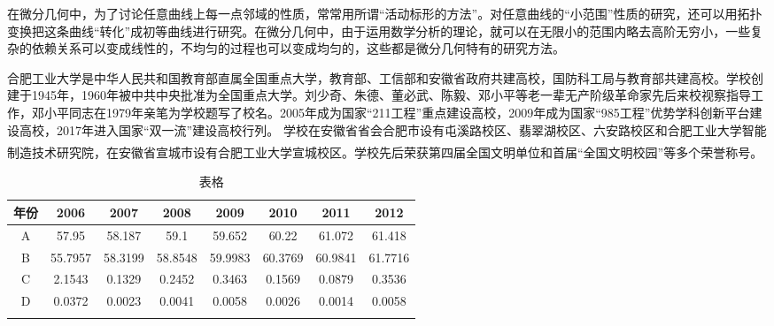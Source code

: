\documentclass{hfutpaper}
\newcommand{\upcite}[1]{\textsuperscript{\textsuperscript{\cite{#1}}}}
\begin{document}
在微分几何中，为了讨论任意曲线上每一点邻域的性质，常常用所谓“活动标形的方法”。对任意曲线的“小范围”性质的研究，还可以用拓扑变换把这条曲线“转化”成初等曲线进行研究。在微分几何中，由于运用数学分析的理论，就可以在无限小的范围内略去高阶无穷小，一些复杂的依赖关系可以变成线性的，不均匀的过程也可以变成均匀的，这些都是微分几何特有的研究方法。


合肥工业大学是中华人民共和国教育部直属全国重点大学，教育部、工信部和安徽省政府共建高校，国防科工局与教育部共建高校。学校创建于1945年，1960年被中共中央批准为全国重点大学。刘少奇、朱德、董必武、陈毅、邓小平等老一辈无产阶级革命家先后来校视察指导工作，邓小平同志在1979年亲笔为学校题写了校名。2005年成为国家“211工程”重点建设高校，2009年成为国家“985工程”优势学科创新平台建设高校，2017年进入国家“双一流”建设高校行列。
学校在安徽省省会合肥市设有屯溪路校区、翡翠湖校区、六安路校区和合肥工业大学智能制造技术研究院，在安徽省宣城市设有合肥工业大学宣城校区。学校先后荣获第四届全国文明单位和首届“全国文明校园”等多个荣誉称号\upcite{bib:one}。
\begin{table}[H]
	\caption{表格}
	\centering
	\begin{tabular}{cccccccc}
		\toprule[1.5pt]
		年份  & 2006&2007&2008&2009&2010 & 2011 & 2012 \\
		\midrule
		A&57.95&58.187&59.1&59.652&60.22&61.072&61.418 \\
		B &55.7957 &58.3199&58.8548&59.9983&60.3769 &60.9841 &61.7716 \\		
		C&2.1543&0.1329&0.2452&0.3463&0.1569&0.0879&0.3536 \\		
		D&0.0372 &0.0023&0.0041&0.0058&0.0026&0.0014&0.0058 \\
		\bottomrule[1.5pt]
		\label{tab1}
	\end{tabular}
\end{table}
\end{document}
